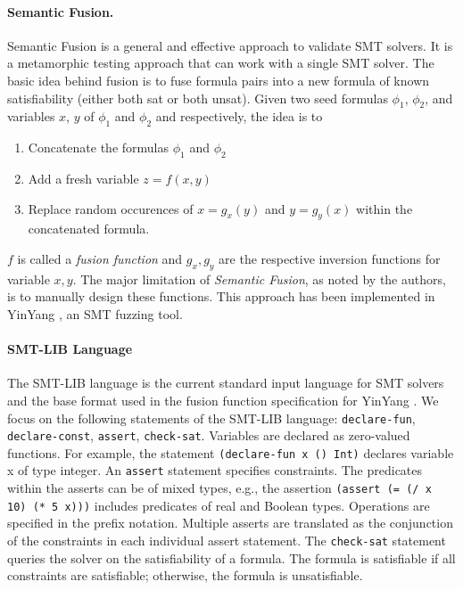 \documentclass[sigplan,screen]{acmart}
\begin{document}
\paragraph{Semantic Fusion.} Semantic Fusion is a general and effective approach to validate SMT solvers. It is a metamorphic testing approach that can work with a single SMT solver. The basic idea behind fusion is to fuse formula pairs into a new formula of known satisfiability (either both sat or both unsat). Given two seed formulas $\phi_1$, $\phi_2$, and variables $x$, $y$ of $\phi_1$ and $\phi_2$ and respectively, the idea is to
\begin{enumerate}
    \item Concatenate the formulas $\phi_1$ and $\phi_2$
    \item Add a fresh variable $z = f(x, y)$
    \item Replace random occurences of $x = g_x(y)$ and $y = g_y(x)$ within the concatenated formula.
\end{enumerate}
$f$ is called a \textit{fusion function} and $g_x, g_y$ are the respective inversion functions for variable $x, y$. The major limitation of \textit{Semantic Fusion}, as noted by the authors, is to manually design these functions. This approach has been implemented in YinYang \cite{YinYang}, an SMT fuzzing tool.

\paragraph{SMT-LIB Language}
The SMT-LIB language \cite{SMTLIB} is the current standard input language for SMT solvers and the base format used in the fusion function specification \cite{fusionfunctions} for YinYang \cite{YinYang}. We focus on the following statements of the SMT-LIB language: \texttt{declare-fun}, \texttt{declare-const}, \texttt{assert}, \texttt{check-sat}. Variables are declared as zero-valued functions. For example, the statement \lstinline[columns=fullflexible]{(declare-fun x () Int)} declares variable x of type integer. An \texttt{assert} statement specifies constraints. The predicates within the asserts can be of mixed types, e.g., the assertion \lstinline[columns=fullflexible]{(assert (= (/ x 10) (* 5 x)))} includes predicates of real and Boolean types. Operations are specified in the prefix notation. Multiple asserts are translated as the conjunction of the constraints in each individual assert statement. The \texttt{check-sat} statement queries the solver on the satisfiability of a formula. The formula is satisfiable if all constraints are satisfiable; otherwise, the formula is unsatisfiable.
\end{document}
